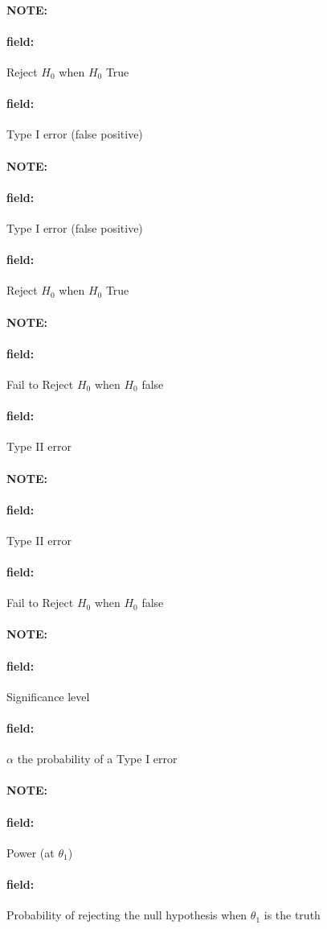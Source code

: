 \documentclass[12pt]{article}
\newenvironment{note}{\paragraph{NOTE:}}{}
\newenvironment{field}{\paragraph{field:}}{}
\begin{document}
\begin{note}
 \begin{field}
  Reject $H_0$ when $H_0$ True
 \end{field}
 \begin{field}
  Type I error (false positive)
 \end{field}
\end{note}

\begin{note}
 \begin{field}
  Type I error (false positive)
 \end{field}
 \begin{field}
  Reject $H_0$ when $H_0$ True
 \end{field}
\end{note}

\begin{note}
 \begin{field}
  Fail to Reject $H_0$ when $H_0$ false
 \end{field}
 \begin{field}
  Type II error
 \end{field}
\end{note}

\begin{note}
 \begin{field}
  Type II error
 \end{field}
 \begin{field}
  Fail to Reject $H_0$ when $H_0$ false
 \end{field}
\end{note}

\begin{note}
 \begin{field}
  Significance level
 \end{field}
 \begin{field}
  $\alpha$ the probability of a Type I error
 \end{field}
\end{note}

\begin{note}
 \begin{field}
  Power (at $\theta_1$)
 \end{field}
 \begin{field}
  Probability of rejecting the null hypothesis when $\theta_1$ is the truth
 \end{field}
\end{note}
\end{document}
